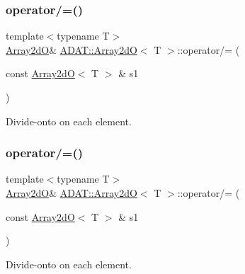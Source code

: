 \subsubsection{\texorpdfstring{operator/=()}{operator/=()}\hspace{0.1cm}{\footnotesize\ttfamily [1/6]}}
{\footnotesize\ttfamily template$<$typename T$>$ \\
\mbox{\hyperlink{classADAT_1_1Array2dO}{Array2dO}}\& \mbox{\hyperlink{classADAT_1_1Array2dO}{A\+D\+A\+T\+::\+Array2dO}}$<$ T $>$\+::operator/= (\begin{DoxyParamCaption}\item[{const \mbox{\hyperlink{classADAT_1_1Array2dO}{Array2dO}}$<$ T $>$ \&}]{s1 }\end{DoxyParamCaption})\hspace{0.3cm}{\ttfamily [inline]}}



Divide-\/onto on each element. 

\mbox{\label{classADAT_1_1Array2dO_a04e77d7a878bbf9ecf4e890848f09009}} 
\subsubsection{\texorpdfstring{operator/=()}{operator/=()}\hspace{0.1cm}{\footnotesize\ttfamily [2/6]}}
{\footnotesize\ttfamily template$<$typename T$>$ \\
\mbox{\hyperlink{classADAT_1_1Array2dO}{Array2dO}}\& \mbox{\hyperlink{classADAT_1_1Array2dO}{A\+D\+A\+T\+::\+Array2dO}}$<$ T $>$\+::operator/= (\begin{DoxyParamCaption}\item[{const \mbox{\hyperlink{classADAT_1_1Array2dO}{Array2dO}}$<$ T $>$ \&}]{s1 }\end{DoxyParamCaption})\hspace{0.3cm}{\ttfamily [inline]}}



Divide-\/onto on each element. 

\mbox{\label{classADAT_1_1Array2dO_a04e77d7a878bbf9ecf4e890848f09009}} 
